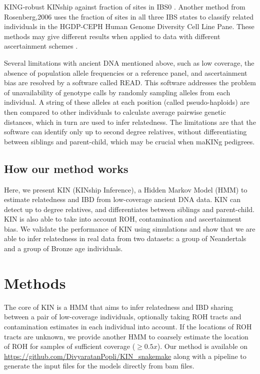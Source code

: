 \documentclass[12pt, letterpaper]{article}
\begin{document}
KING‐robust KINship against fraction of sites in IBS0 \cite{manichaikul_robust_2010}. Another method from Rosenberg,2006 \cite{rosenberg_standardized_2006} uses the fraction of sites in all three IBS states to classify related individuals in the HGDP-CEPH Human Genome Diversity Cell Line Pane. These methods may give different results when applied to data with different ascertainment schemes \cite{waples_allele_2019}. 

Several limitations with ancient DNA mentioned above, such as low coverage, the absence of population allele frequencies or a reference panel, and ascertainment bias are resolved by a software called READ. This software addresses the problem of unavailability of genotype calls by randomly sampling alleles from each individual. A string of these alleles at each position (called pseudo-haploids) are then compared to other individuals to calculate average pairwise genetic distances, which in turn are used to infer relatedness. The limitations are that the software can identify only up to second degree relatives, without differentiating between siblings and parent-child, which may be crucial when maKINg pedigrees.

\subsection{How our method works}
Here, we present KIN (KINship Inference), a Hidden Markov Model (HMM) to estimate relatedness and IBD from low-coverage ancient DNA data. KIN can detect up to  degree relatives, and differentiates between siblings and parent-child. KIN is also able to take into account ROH, contamination and ascertainment bias. We validate the performance of KIN using simulations and show that we are able to infer relatedness in real data from two datasets: a group of Neandertals and a group of Bronze age individuals.


\section{Methods}

The core of  KIN is a HMM that aims to infer relatedness and IBD sharing between a pair of low-coverage individuals, optionally taking ROH tracts and contamination estimates in each individual into account. If the locations of ROH tracts are unknown, we provide another HMM to coarsely estimate the location of ROH for samples  of sufficient coverage ($\geq 0.5x$). Our method is available on \url{https://github.com/DivyaratanPopli/KIN_snakemake} along with a  \cite{koster_snakemakescalable_2012} pipeline to generate the input files for the models directly from bam files. 
\end{document}
